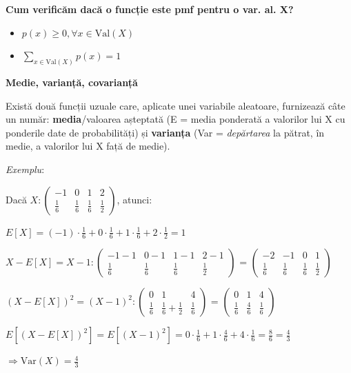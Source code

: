 \documentclass[12pt]{article}
\begin{document}
	\textbf{Cum verificăm dacă o funcție este pmf pentru o var. al. X?}
	\begin{itemize}
		\item $p(x) \geq 0, \forall x \in \text{Val}(X)$
		\item $\sum_{x \in \text{Val}(X)}p(x) = 1$
	\end{itemize}
	
\textbf{\large{Medie, varianță, covarianță}}
	
	Există două funcții uzuale care, aplicate unei variabile aleatoare, furnizează câte un număr: \textbf{media}/valoarea așteptată (E = media ponderată a valorilor lui X cu ponderile date de probabilități) și \textbf{varianța} (Var = \textit{depărtarea} la pătrat, în medie, a valorilor lui X față de medie).
	
	\textit{Exemplu}:
	
	Dacă $X : \begin{pmatrix}
	-1 & 0 & 1 & 2\\
	\frac{1}{6} & \frac{1}{6} & \frac{1}{6} & \frac{1}{2}
	\end{pmatrix}$, atunci:
	
	$E[X] = (-1) \cdot \frac{1}{6} + 0 \cdot \frac{1}{6} + 1 \cdot \frac{1}{6} + 2 \cdot \frac{1}{2} = 1$
	
	$X - E[X] = X - 1: \begin{pmatrix}
	-1-1 & 0-1 & 1-1 & 2-1\\
	\frac{1}{6} & \frac{1}{6} & \frac{1}{6} & \frac{1}{2}
	\end{pmatrix}$ = $\begin{pmatrix}
	-2 & -1 & 0 & 1\\
	\frac{1}{6} & \frac{1}{6} & \frac{1}{6} & \frac{1}{2}
	\end{pmatrix}$
	
	$(X - E[X])^2 = (X - 1)^2: \begin{pmatrix}
	0 & 1 & 4\\
	\frac{1}{6} & \frac{1}{6} + \frac{1}{2} & \frac{1}{6}
	\end{pmatrix}$ = $\begin{pmatrix}
	0 & 1 & 4\\
	\frac{1}{6} & \frac{4}{6} & \frac{1}{6}
	\end{pmatrix}$
	
	$E[(X - E[X])^2] = E[(X - 1)^2] = 0 \cdot \frac{1}{6} + 1 \cdot \frac{4}{6} + 4 \cdot \frac{1}{6} = \frac{8}{6} = \frac{4}{3}$
	
	$\Rightarrow \text{Var}(X) = \frac{4}{3}$
	
\end{document}
